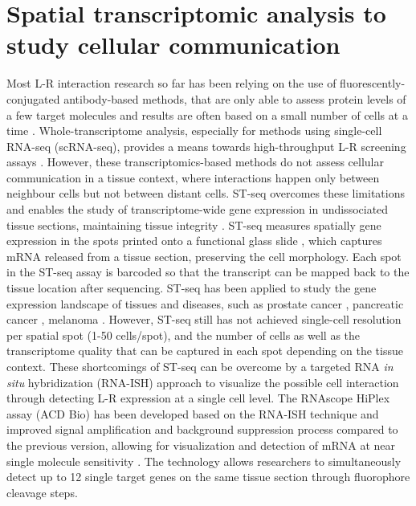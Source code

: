 \section{Spatial transcriptomic analysis to study cellular communication}
\label{Sec:2.1_intro}	%
Most L-R interaction research so far has been relying on the use of fluorescently-conjugated antibody-based methods, that are only able to assess protein levels of a few target molecules and results are often based on a small number of cells at a time \cite{moses2022museum, lewis2021spatial}. Whole-transcriptome analysis, especially for methods using single-cell RNA-seq (scRNA-seq), provides a means towards high-throughput L-R screening assays \cite{browaeys2020nichenet, efremova2020cellphonedb}. However, these transcriptomics-based methods do not assess cellular communication in a tissue context, where interactions happen only between neighbour cells but not between distant cells. ST-seq overcomes these limitations and enables the study of transcriptome-wide gene expression in undissociated tissue sections, maintaining tissue integrity \cite{salmen2018barcoded}. ST-seq measures spatially  gene expression in the spots printed onto a functional glass slide \cite{salmen2018barcoded}, which captures mRNA released from a tissue section, preserving the cell morphology. Each spot in the ST-seq assay is barcoded so that the transcript can be mapped back to the tissue location after sequencing. ST-seq has been applied to study the gene expression landscape of tissues and diseases, such as prostate cancer \cite{berglund2018spatial, ji2020multimodal}, pancreatic cancer \cite{moncada2019integrating}, melanoma \cite{thrane2018spatially}. However, ST-seq still has not achieved single-cell resolution per spatial spot (1-50 cells/spot), and the number of cells as well as the transcriptome quality that can be captured in each spot depending on the tissue context. These shortcomings of ST-seq can be overcome by a targeted RNA \textit{in situ} hybridization (RNA-ISH) approach to visualize the possible cell interaction through detecting L-R expression at a single cell level. The RNAscope HiPlex assay (ACD Bio) has been developed based on the RNA-ISH technique and improved signal amplification and background suppression process compared to the previous version, allowing for visualization and detection of mRNA at near single molecule sensitivity \cite{wang2012rnascope,schulz2018simultaneous}. The technology allows researchers to simultaneously detect up to 12 single target genes on the same tissue section through fluorophore cleavage steps.  

